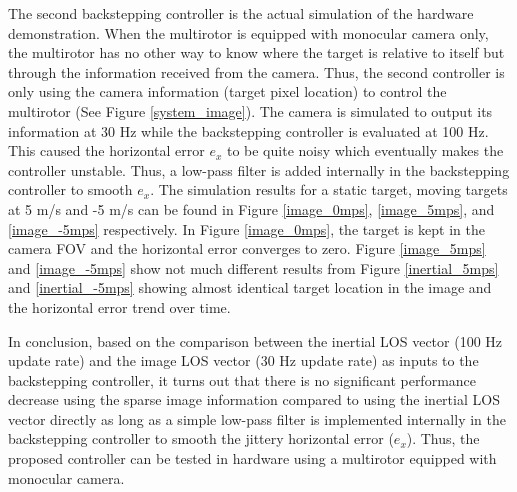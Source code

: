 The second backstepping controller is the actual simulation of the hardware demonstration. When the multirotor is equipped with monocular camera only, the multirotor has no other way to know where the target is relative to itself but through the information received from the camera. Thus, the second controller is only using the camera information (target pixel location) to control the multirotor (See Figure \ref{system_image}). The camera is simulated to output its information at 30 Hz while the backstepping controller is evaluated at 100 Hz. This caused the horizontal error $e_x$ to be quite noisy which eventually makes the controller unstable. Thus, a low-pass filter is added internally in the backstepping controller to smooth $e_x$. The simulation results for a static target, moving targets at 5 m/s and -5 m/s can be found in Figure \ref{image_0mps}, \ref{image_5mps}, and \ref{image_-5mps} respectively. In Figure \ref{image_0mps}, the target is kept in the camera FOV and the horizontal error converges to zero. Figure \ref{image_5mps} and \ref{image_-5mps} show not much different results from Figure \ref{inertial_5mps} and \ref{inertial_-5mps} showing almost identical target location in the image and the horizontal error trend over time. 

In conclusion, based on the comparison between the inertial LOS vector (100 Hz update rate) and the image LOS vector (30 Hz update rate) as inputs to the backstepping controller, it turns out that there is no significant performance decrease using the sparse image information compared to using the inertial LOS vector directly as long as a simple low-pass filter is implemented internally in the backstepping controller to smooth the jittery horizontal error ($e_x$). Thus, the proposed controller can be tested in hardware using a multirotor equipped with monocular camera.

